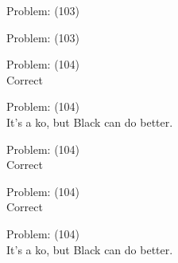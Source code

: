 \documentclass[11pt]{article}
\begin{document}
\begin{minipage}[t]{0.5\textwidth}
  {\centering
  
  Problem: (103)\\
  
  }
\end{minipage}
\begin{minipage}[t]{0.5\textwidth}
  {\centering
  
  Problem: (103)\\
  
  }
\end{minipage}
\begin{minipage}[t]{0.5\textwidth}
  {\centering
  
  Problem: (104)\\
  Correct\\
  }
\end{minipage}
\begin{minipage}[t]{0.5\textwidth}
  {\centering
  
  Problem: (104)\\
  It's a ko, but Black can do better.\\
  }
\end{minipage}
\begin{minipage}[t]{0.5\textwidth}
  {\centering
  
  Problem: (104)\\
  Correct\\
  }
\end{minipage}
\begin{minipage}[t]{0.5\textwidth}
  {\centering
  
  Problem: (104)\\
  Correct\\
  }
\end{minipage}
\begin{minipage}[t]{0.5\textwidth}
  {\centering
  
  Problem: (104)\\
  It's a ko, but Black can do better.\\
  }
\end{minipage}
\end{document}
